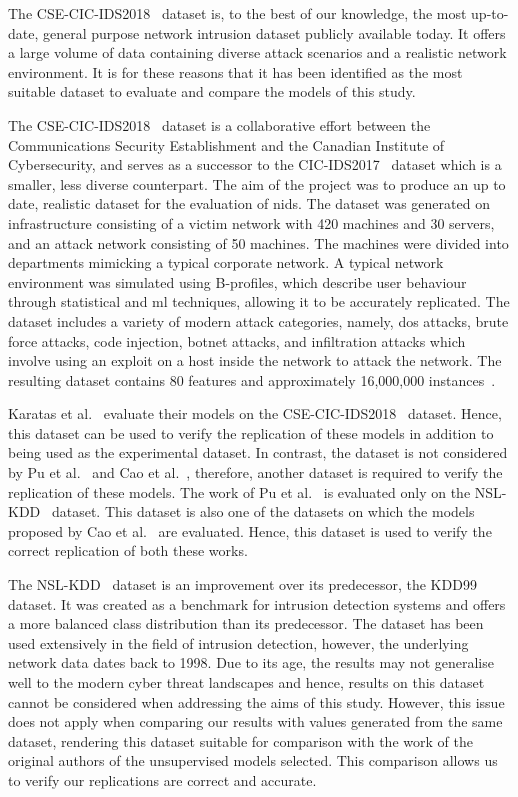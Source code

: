 The CSE-CIC-IDS2018~\cite{cic2018} dataset is, to the best of our knowledge,
the most up-to-date, general purpose network intrusion dataset publicly
available today. It offers a large volume of data containing diverse attack
scenarios and a realistic network environment. It is for these reasons that it
has been identified as the most suitable dataset to evaluate and compare the
models of this study.

The CSE-CIC-IDS2018~\cite{cic2018} dataset is a collaborative effort between
the Communications Security Establishment and the Canadian Institute of
Cybersecurity, and serves as a successor to the CIC-IDS2017~\cite{cic2017}
dataset which is a smaller, less diverse counterpart. The aim of the project
was to produce an up to date, realistic dataset for the evaluation of
\gls{nids}. The dataset was generated on infrastructure consisting of a victim
network with 420 machines and 30 servers, and an attack network consisting of
50 machines. The machines were divided into departments mimicking a typical
corporate network. A typical network environment was simulated using
B-profiles, which describe user behaviour through statistical and \gls{ml}
techniques, allowing it to be accurately replicated. The dataset includes a
variety of modern attack categories, namely, \gls{dos} attacks, brute force
attacks, code injection, botnet attacks, and infiltration attacks which involve
using an exploit on a host inside the network to attack the network. The
resulting dataset contains 80 features and approximately 16,000,000
instances~\cite{cic2018, cic2018data}.

Karatas et al.~\cite{Karatas} evaluate their models on the
CSE-CIC-IDS2018~\cite{cic2018} dataset. Hence, this dataset can be used to
verify the replication of these models in addition to being used as the
experimental dataset. In contrast, the dataset is not considered by Pu et
al.~\cite{Pu} and Cao et al.~\cite{Cao}, therefore, another dataset is required
to verify the replication of these models. The work of Pu et al.~\cite{Pu} is
evaluated only on the NSL-KDD~\cite{nsl} dataset. This dataset is also one of
the datasets on which the models proposed by Cao et al.~\cite{Cao} are
evaluated. Hence, this dataset is used to verify the correct replication of
both these works.

The NSL-KDD~\cite{nsl} dataset is an improvement over its predecessor, the
KDD99~\cite{kdd99} dataset. It was created as a benchmark for intrusion
detection systems and offers a more balanced class distribution than its
predecessor. The dataset has been used extensively in the field of intrusion
detection, however, the underlying network data dates back to 1998. Due to its
age, the results may not generalise well to the modern cyber threat landscapes
and hence, results on this dataset cannot be considered when addressing the
aims of this study. However, this issue does not apply when comparing our
results with values generated from the same dataset, rendering this dataset
suitable for comparison with the work of the original authors of the
unsupervised models selected. This comparison allows us to verify our
replications are correct and accurate.

